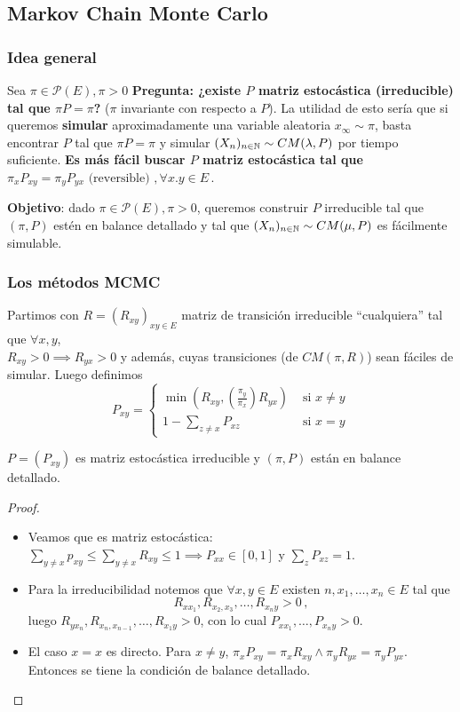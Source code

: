 \subsection{Markov Chain Monte Carlo}
\subsubsection{Idea general}
Sea $\pi\in \mathcal{P}(E),\pi>0$
\newline \textbf{Pregunta: ¿existe $P$ matriz estocástica (irreducible) tal que $\pi P=\pi$?} ($\pi$ invariante con respecto a $P$).
\newp La utilidad de esto sería que si queremos \textbf{simular} aproximadamente una variable aleatoria $x_\infty\sim\pi$, basta encontrar $P$ tal que $\pi P=\pi$ y simular $(X_n)_{n\in\mathbb{N}}\sim CM(\lambda,P)$ por tiempo suficiente.
\newline \textbf{Es más fácil buscar $P$ matriz estocástica tal que $\pi_xP_{xy}=\pi_yP_{yx} \mbox{ (reversible) }, \forall x.y\in E$}\,.

\newp \textbf{Objetivo}: dado $\pi\in\mathcal{P}(E),\pi>0$, queremos construir $P$ irreducible tal que $(\pi,P)$ estén en balance detallado y tal que $(X_n)_{n\in\mathbb{N}}\sim CM(\mu,P)$ es fácilmente simulable.
\subsubsection{Los métodos MCMC}
Partimos con $R=(R_{xy})_{xy\in E}$ matriz de transición irreducible ``cualquiera'' tal que $\forall x,y$,\\ $R_{xy}>0\implies R_{yx}>0$ y además, cuyas transiciones (de $CM(\pi,R)$) sean fáciles de simular.
\newline Luego definimos
$$ P_{xy}=\begin{cases}
\min(R_{xy},(\frac{\pi_y}{\pi_x})R_{yx})  & \mbox{ si }x\neq y\\
1-\displaystyle\sum_{z\neq x}P_{xz}  & \mbox{ si }x=y
\end{cases}$$
\begin{proposition}
$P=(P_{xy})$ es matriz estocástica irreducible y $(\pi,P)$ están en balance detallado.
\end{proposition}
\begin{proof}
\gris
\beforeitemize
\begin{itemize}
    \item Veamos que es matriz estocástica: $\sum_{y\neq x}p_{xy}\leq \sum_{y\neq x}R_{xy}\leq 1 \implies P_{xx}\in[0,1]$ y $\sum_z P_{xz}=1$.
    \item Para la irreducibilidad notemos que $\forall x,y\in E$ existen $n,x_1,\dots,x_n\in E$ tal que 
    $$R_{xx_1},R_{x_2,x_3},\dots,R_{x_ny}>0\,,$$
    luego $R_{yx_n},R_{x_n,x_{n-1}},\dots,R_{x_1y}>0$, con lo cual $P_{xx_1},\dots,P_{x_ny}>0$.
    \item El caso $x=x$ es directo. Para $x\neq y$, $\pi_xP_{xy}=\pi_xR_{xy}\land \pi_yR_{yx}=\pi_yP_{yx}$. \\ Entonces se tiene la condición de balance detallado.
\end{itemize}
\findem
\negro
\end{proof}

